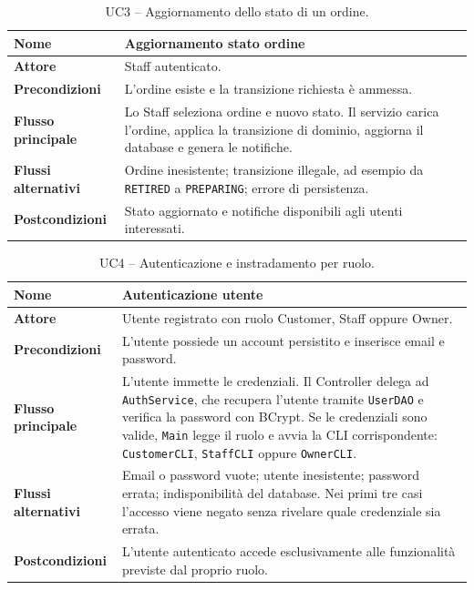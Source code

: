 \documentclass[12pt,a4paper]{article}
\newcommand{\code}[1]{\nolinkurl{#1}}
\begin{document}
\begin{longtable}{|>{\bfseries}p{3cm}|p{10.5cm}|}
\caption{UC3 -- Aggiornamento dello stato di un ordine.}\label{tab:uc-order-status}\\
\hline
Nome & Aggiornamento stato ordine \\
\hline
Attore & Staff autenticato. \\
\hline
Precondizioni & L'ordine esiste e la transizione richiesta è ammessa. \\
\hline
Flusso principale &
Lo Staff seleziona ordine e nuovo stato. Il servizio carica l'ordine, applica
la transizione di dominio, aggiorna il database e genera le notifiche. \\
\hline
Flussi alternativi &
Ordine inesistente; transizione illegale, ad esempio da \code{RETIRED} a
\code{PREPARING}; errore di persistenza. \\
\hline
Postcondizioni & Stato aggiornato e notifiche disponibili agli utenti interessati. \\
\hline
\end{longtable}

\begin{longtable}{|>{\bfseries}p{3cm}|p{10.5cm}|}
\caption{UC4 -- Autenticazione e instradamento per ruolo.}\label{tab:uc-login}\\
\hline
Nome & Autenticazione utente \\ 
\hline
Attore & Utente registrato con ruolo Customer, Staff oppure Owner. \\
\hline
Precondizioni & L'utente possiede un account persistito e inserisce email e password. \\
\hline
Flusso principale &
L'utente immette le credenziali. Il Controller delega ad
\code{AuthService}, che recupera l'utente tramite \code{UserDAO} e verifica la
password con BCrypt. Se le credenziali sono valide, \code{Main} legge il ruolo e
avvia la CLI corrispondente: \code{CustomerCLI}, \code{StaffCLI} oppure
\code{OwnerCLI}. \\
\hline
Flussi alternativi &
Email o password vuote; utente inesistente; password errata; indisponibilità del
database. Nei primi tre casi l'accesso viene negato senza rivelare quale
credenziale sia errata. \\
\hline
Postcondizioni & L'utente autenticato accede esclusivamente alle funzionalità previste dal proprio ruolo. \\
\hline
\end{longtable}
\end{document}
